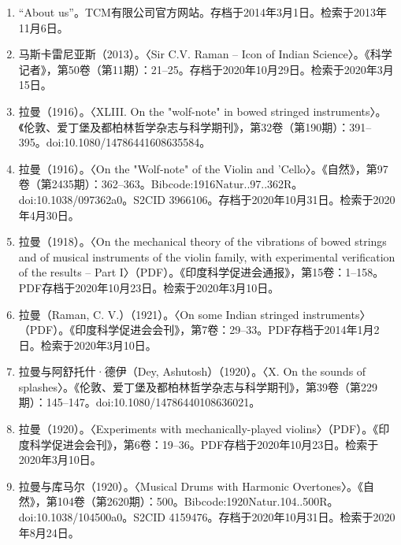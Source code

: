 \begin{enumerate}
\item “About us”。TCM有限公司官方网站。存档于2014年3月1日。检索于2013年11月6日。
\item 马斯卡雷尼亚斯（2013）。〈Sir C.V. Raman – Icon of Indian Science〉。《科学记者》，第50卷（第11期）：21–25。存档于2020年10月29日。检索于2020年3月15日。
\item 拉曼（1916）。〈XLIII. On the "wolf-note" in bowed stringed instruments〉。《伦敦、爱丁堡及都柏林哲学杂志与科学期刊》，第32卷（第190期）：391–395。doi:10.1080/14786441608635584。
\item 拉曼（1916）。〈On the "Wolf-note" of the Violin and 'Cello〉。《自然》，第97卷（第2435期）：362–363。Bibcode:1916Natur..97..362R。doi:10.1038/097362a0。S2CID 3966106。存档于2020年10月31日。检索于2020年4月30日。
\item 拉曼（1918）。〈On the mechanical theory of the vibrations of bowed strings and of musical instruments of the violin family, with experimental verification of the results – Part I〉（PDF）。《印度科学促进会通报》，第15卷：1–158。PDF存档于2020年10月23日。检索于2020年3月10日。
\item 拉曼（Raman, C. V.）（1921）。〈On some Indian stringed instruments〉（PDF）。《印度科学促进会会刊》，第7卷：29–33。PDF存档于2014年1月2日。检索于2020年3月10日。
\item 拉曼与阿舒托什·德伊（Dey, Ashutosh）（1920）。〈X. On the sounds of splashes〉。《伦敦、爱丁堡及都柏林哲学杂志与科学期刊》，第39卷（第229期）：145–147。doi:10.1080/14786440108636021。
\item 拉曼（1920）。〈Experiments with mechanically-played violins〉（PDF）。《印度科学促进会会刊》，第6卷：19–36。PDF存档于2020年10月23日。检索于2020年3月10日。
\item 拉曼与库马尔（1920）。〈Musical Drums with Harmonic Overtones〉。《自然》，第104卷（第2620期）：500。Bibcode:1920Natur.104..500R。doi:10.1038/104500a0。S2CID 4159476。存档于2020年10月31日。检索于2020年8月24日。


\end{enumerate}
